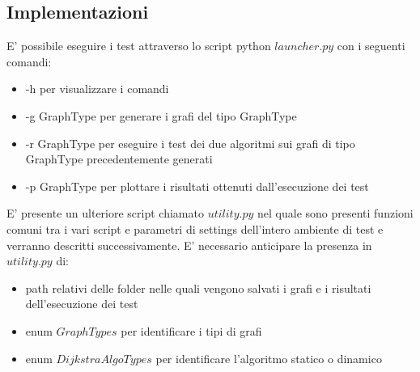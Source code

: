 \documentclass[a4paper]{article}
\begin{document}
\subsection{Implementazioni}
E' possibile eseguire i test attraverso lo script python $launcher.py$ con i seguenti comandi:
\begin{itemize}
\item -h per visualizzare i comandi
\item -g GraphType per generare i grafi del tipo GraphType
\item -r GraphType per eseguire i test dei due algoritmi sui grafi di tipo GraphType precedentemente generati
\item -p GraphType per plottare i risultati ottenuti dall'esecuzione dei test
\end{itemize}
E' presente un ulteriore script chiamato $utility.py$ nel quale sono presenti funzioni comuni tra i vari script e parametri di settings dell'intero ambiente di test e verranno descritti successivamente. E' necessario anticipare la presenza in $utility.py$ di:
\begin{itemize}
\item path relativi delle folder nelle quali vengono salvati i grafi e i risultati dell'esecuzione dei test
\item enum $GraphTypes$ per identificare i tipi di grafi
\item enum $DijkstraAlgoTypes$ per identificare l'algoritmo statico o dinamico
\end{itemize}
\newpage
\end{document}
